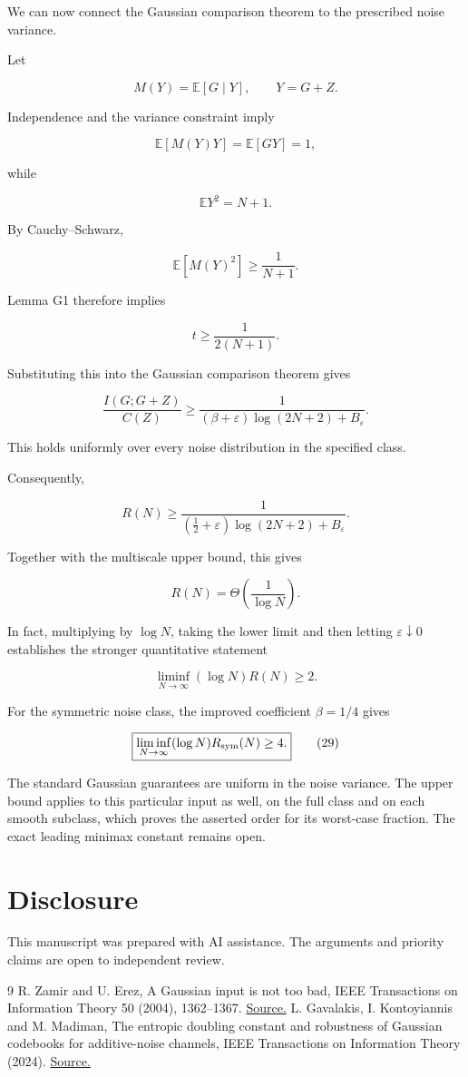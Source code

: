 \documentclass[11pt]{article}
\begin{document}
We can now connect the Gaussian comparison theorem to the prescribed noise variance.

Let

\[
M(Y)=\mathbb E[G\mid Y],
\qquad Y=G+Z.
\]

Independence and the variance constraint imply

\[
\mathbb E[M(Y)Y]=\mathbb E[GY]=1,
\]

while

\[
\mathbb EY^2=N+1.
\]

By Cauchy--Schwarz,

\[
\mathbb E[M(Y)^2]\geq\frac1{N+1}.
\]

Lemma G1 therefore implies

\[
\boxed{t\geq\frac1{2(N+1)}.}
\]

Substituting this into the Gaussian comparison theorem gives

\[
\frac{I(G;G+Z)}{C(Z)}
\geq
\frac1{
(\beta+\varepsilon)\log(2N+2)+B_\varepsilon
}.
\]

This holds uniformly over every noise distribution in the specified class.

Consequently,

\[
R(N)\geq
\frac1{
(\frac12+\varepsilon)\log(2N+2)+B_\varepsilon
}.
\]

Together with the multiscale upper bound, this gives

\[
\boxed{
R(N)=\Theta\left(\frac1{\log N}\right).
}
\]

In fact, multiplying by \(\log N\), taking the lower limit and then letting \(\varepsilon\downarrow0\) establishes the stronger quantitative statement

\[
\boxed{
\liminf_{N\to\infty}(\log N)R(N)\geq2.
}
\tag{28}
\]

For the symmetric noise class, the improved coefficient \(\beta=1/4\) gives

\[
\boxed{
\liminf_{N\to\infty}(\log N)R_{\rm sym}(N)\geq4.
}
\tag{29}
\]

The standard Gaussian guarantees are uniform in the noise variance. The upper bound applies to this particular input as well, on the full class and on each smooth subclass, which proves the asserted order for its worst-case fraction. The exact leading minimax constant remains open.

\section*{Disclosure}
This manuscript was prepared with AI assistance. The arguments and priority claims are open to independent review.

\begin{thebibliography}{9}
 R. Zamir and U. Erez, A Gaussian input is not too bad, IEEE Transactions on Information Theory 50 (2004), 1362--1367. \href{https://doi.org/10.1109/TIT.2004.828153}{Source.}
 L. Gavalakis, I. Kontoyiannis and M. Madiman, The entropic doubling constant and robustness of Gaussian codebooks for additive-noise channels, IEEE Transactions on Information Theory (2024). \href{https://arxiv.org/abs/2403.07209}{Source.}
\end{thebibliography}
\end{document}
